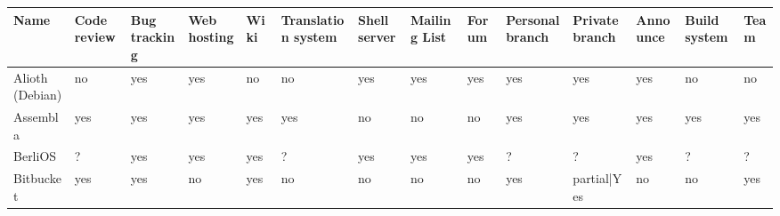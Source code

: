 %
% 


\begin{landscape}
    \begin{table}[H]
    \centering
    \resizebox{1.5\textwidth}{!} {
        \begin{tabular}{|l|l|l|l|l|l|l|l|l|l|l|l|l|l|}
            \hline {\bf Name} & {\bf Code review} & {\bf Bug tracking} & {\bf Web hosting} & {\bf Wiki} & {\bf Translation system} & {\bf Shell server} & {\bf Mailing List} & {\bf Forum} & {\bf Personal branch} & {\bf Private branch} & {\bf Announce} & {\bf Build system} & {\bf Team}\\

            \hline Alioth (Debian) & no \cellcolor{red} & yes \cellcolor{green} & yes \cellcolor{green} & no \cellcolor{red} & no \cellcolor{red} & yes \cellcolor{green} & yes \cellcolor{green} & yes \cellcolor{green} & yes \cellcolor{green} & yes \cellcolor{green} & yes \cellcolor{green} & no \cellcolor{red} & no \cellcolor{red} \\

            \hline Assembla & yes \cellcolor{green} & yes \cellcolor{green} & yes \cellcolor{green} & yes \cellcolor{green} & yes \cellcolor{green} & no \cellcolor{red} & no \cellcolor{red} & no \cellcolor{red} & yes \cellcolor{green} & yes \cellcolor{green} & yes \cellcolor{green} & yes \cellcolor{green} & yes \cellcolor{green}\\

            \hline BerliOS & ? & yes \cellcolor{green} & yes \cellcolor{green} & yes \cellcolor{green} & ? & yes \cellcolor{green} & yes \cellcolor{green} & yes \cellcolor{green} & ? & ? & yes \cellcolor{green} & ? & ?\\

            \hline Bitbucket & yes \cellcolor{green} & yes & no \cellcolor{red} & yes \cellcolor{green} & no \cellcolor{red} & no \cellcolor{red} & no \cellcolor{red} & no \cellcolor{red} & yes \cellcolor{green} & partial|Yes \cellcolor{yellow} & no \cellcolor{red} & no \cellcolor{red} & yes \cellcolor{green}\\


\end{tabular}}
\end{table}
\end{landscape}
